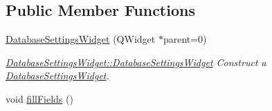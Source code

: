 \subsection*{Public Member Functions}
\begin{DoxyCompactItemize}
\item 
\hyperlink{classGui_1_1Widgets_1_1DatabaseSettingsWidget_a723805fcd8e71878c6d66b7296f16d85}{Database\+Settings\+Widget} (Q\+Widget $\ast$parent=0)
\begin{DoxyCompactList}\small\item\em \hyperlink{classGui_1_1Widgets_1_1DatabaseSettingsWidget_a723805fcd8e71878c6d66b7296f16d85}{Database\+Settings\+Widget\+::\+Database\+Settings\+Widget} Construct a \hyperlink{classGui_1_1Widgets_1_1DatabaseSettingsWidget}{Database\+Settings\+Widget}. \end{DoxyCompactList}\item 
\hypertarget{classGui_1_1Widgets_1_1DatabaseSettingsWidget_a79e2fb995dbd14f4c4d0b54bdfaf5d5f}{}void \hyperlink{classGui_1_1Widgets_1_1DatabaseSettingsWidget_a79e2fb995dbd14f4c4d0b54bdfaf5d5f}{fill\+Fields} ()\label{classGui_1_1Widgets_1_1DatabaseSettingsWidget_a79e2fb995dbd14f4c4d0b54bdfaf5d5f}


\end{DoxyCompactItemize}
